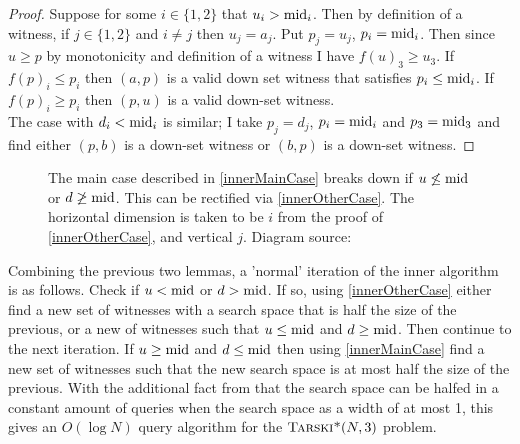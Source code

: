 \begin{proof}
  Suppose for some $i \in \{1, 2\}$ that $u_i > \text{mid}_i$. Then
  by definition of a witness, if $j \in \{1, 2\}$ and $i \neq j$ then $u_j = a_j$.
  Put $p_j = u_j$, $p_i = \text{mid}_i$. Then since $u \geq p$ by monotonicity
  and definition of a witness I have $f(u)_3 \geq u_3$. If $f(p)_i \leq p_i$ then
  $(a, p)$ is a valid down set witness that satisfies $p_i \leq \text{mid}_i$. If
  $f(p)_i \geq p_i$ then $(p, u)$ is a valid down-set witness. \\
  The case with $d_i < \text{mid}_i$ is similar; I take $p_j = d_j$, $p_i = \text{mid}_i$ and $p_3 = \text{mid}_3$
  and find either $(p, b)$ is a down-set witness or $(b, p)$ is a down-set witness.
\end{proof}
\begin{figure}[ht]
  \centering
  \scalebox{0.5}{}
  \caption{The main case described in \cref{innerMainCase} breaks down if $u \not\leq \text{mid}$ or $d \not\geq \text{mid}$.
  This can be rectified via \cref{innerOtherCase}. The horizontal dimension is taken
  to be $i$ from the proof of \cref{innerOtherCase}, and vertical $j$. Diagram source: \citep{fasterTarski}}
\end{figure}
Combining
the previous two lemmas, a 'normal' iteration of the inner algorithm is as follows.
Check if $u < \text{mid}$ or $d > \text{mid}$. If so, using \cref{innerOtherCase} either find a new
set of witnesses with a search space that is half the size of the previous, or a new of
witnesses such that $u \leq \text{mid}$ and $d \geq \text{mid}$. Then continue to the next iteration.
If $u \geq \text{mid}$ and $d \leq \text{mid}$ then using \cref{innerMainCase} find a new set of witnesses
such that the new search space is at most half the size of the previous.
With the additional fact from \citep{fasterTarski} that the search space can be halfed in a constant amount of
queries when the search space as a width of at most 1, this gives an $O(\log N)$ query algorithm
for the $\textsc{Tarski*}(N, 3)$ problem.

